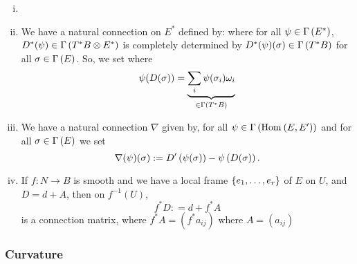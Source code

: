 \documentclass[main.tex]{subfiles}
\begin{document}
\begin{exmp}
\begin{enumerate}
\begin{enumerate}[(i)]
            \item {}

            \item {} We have a natural connection on $E^*$ defined by:
            where for all $\psi \in \Gamma\left( E^* \right)$, $D^*(\psi) \in \Gamma\left( T^*B \otimes E^* \right)$ is completely determined by $D^*(\psi)(\sigma) \in \Gamma\left( T^*B \right)$ for all $\sigma \in \Gamma\left( E \right)$. So, we set
            where
            \[
            \psi(D(\sigma)) = \underbrace{\sum_{i} \psi(\sigma_i) \omega_i}_{\in \Gamma\left( T^*B \right)}
            \]

            \item {} We have a natural connection $\nabla$ given by, for all $\psi \in \Gamma\left( \text{Hom}_{}\left( E, E^\prime \right) \right)$ and for all $\sigma \in \Gamma\left( E \right)$ we set
            \[
            \nabla(\psi)(\sigma) := D^\prime\left(  \psi(\sigma)  \right) - \psi\left( D(\sigma) \right).
            \]

            \item If $f: N \to B$ is smooth and we have a local frame $\left\{e_1, \dots, e_r\right\}$ of $E$ on $U$, and $D = d + A$, then on $f^{-1}(U)$,
            \[
            f^*D: = d + f^*A
            \]
            is a connection matrix, where $f^*A = (f^*a_{ij})$ where $A = (a_{ij})$

        \end{enumerate}

        \end{enumerate}
\end{exmp}

        \subsubsection{Curvature}
\end{document}
